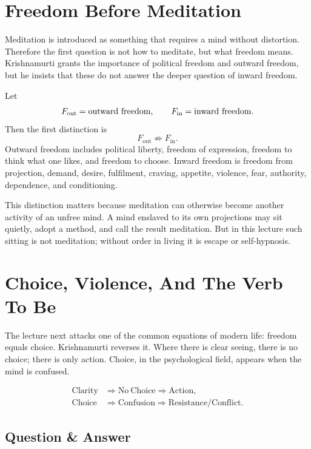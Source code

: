 \documentclass[11pt,oneside]{book}
\begin{document}
\section{Freedom Before Meditation}

Meditation is introduced as something that requires a mind without distortion. Therefore the first question is not how to meditate, but what freedom means. Krishnamurti grants the importance of political freedom and outward freedom, but he insists that these do not answer the deeper question of inward freedom.

Let
\[
F_{\mathrm{out}}=\hbox{outward freedom}, \qquad
F_{\mathrm{in}}=\hbox{inward freedom}.
\]
Then the first distinction is
\begin{equation}
F_{\mathrm{out}} \not\Rightarrow F_{\mathrm{in}} .
\end{equation}
Outward freedom includes political liberty, freedom of expression, freedom to think what one likes, and freedom to choose. Inward freedom is freedom from projection, demand, desire, fulfilment, craving, appetite, violence, fear, authority, dependence, and conditioning.

This distinction matters because meditation can otherwise become another activity of an unfree mind. A mind enslaved to its own projections may sit quietly, adopt a method, and call the result meditation. But in this lecture such sitting is not meditation; without order in living it is escape or self-hypnosis.

\section{Choice, Violence, And The Verb To Be}

The lecture next attacks one of the common equations of modern life: freedom equals choice. Krishnamurti reverses it. Where there is clear seeing, there is no choice; there is only action. Choice, in the psychological field, appears when the mind is confused.

\begin{align}
\mathrm{Clarity} &\Rightarrow \mathrm{No\ Choice} \Rightarrow \mathrm{Action},\\
\mathrm{Choice} &\Rightarrow \mathrm{Confusion} \Rightarrow \mathrm{Resistance/Conflict}.
\end{align}

\subsection{Question \& Answer}
\end{document}
